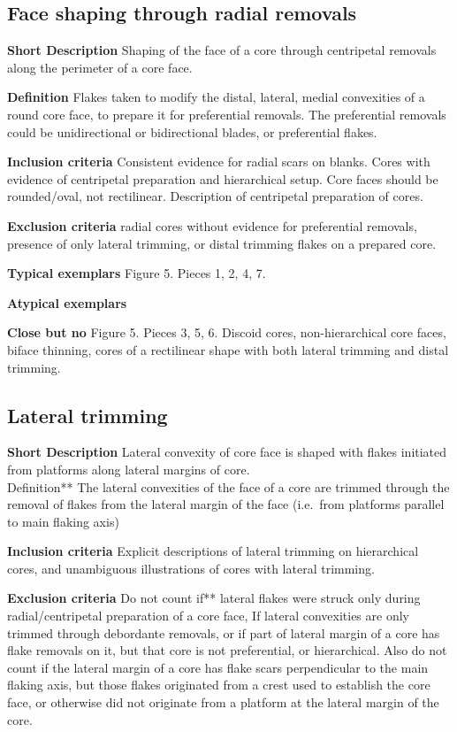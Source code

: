 \documentclass[
]{article}
\begin{document}
\hypertarget{face-shaping-through-radial-removals-1}{%
\subsection{Face shaping through radial
removals}\label{face-shaping-through-radial-removals-1}}

\textbf{Short Description} Shaping of the face of a core through
centripetal removals along the perimeter of a core face.

\textbf{Definition} Flakes taken to modify the distal, lateral, medial
convexities of a round core face, to prepare it for preferential
removals. The preferential removals could be unidirectional or
bidirectional blades, or preferential flakes.

\textbf{Inclusion criteria} Consistent evidence for radial scars on
blanks. Cores with evidence of centripetal preparation and hierarchical
setup. Core faces should be rounded/oval, not rectilinear. Description
of centripetal preparation of cores.

\textbf{Exclusion criteria} radial cores without evidence for
preferential removals, presence of only lateral trimming, or distal
trimming flakes on a prepared core.

\textbf{Typical exemplars} Figure 5. Pieces 1, 2, 4, 7.

\textbf{Atypical exemplars}

\textbf{Close but no} Figure 5. Pieces 3, 5, 6. Discoid cores,
non-hierarchical core faces, biface thinning, cores of a rectilinear
shape with both lateral trimming and distal trimming.

\hypertarget{lateral-trimming}{%
\subsection{Lateral trimming}\label{lateral-trimming}}

\textbf{Short Description} Lateral convexity of core face is shaped with
flakes initiated from platforms along lateral margins of core.\\
Definition** The lateral convexities of the face of a core are trimmed
through the removal of flakes from the lateral margin of the face
(i.e.~from platforms parallel to main flaking axis)

\textbf{Inclusion criteria} Explicit descriptions of lateral trimming on
hierarchical cores, and unambiguous illustrations of cores with lateral
trimming.

\textbf{Exclusion criteria} Do not count if** lateral flakes were struck
only during radial/centripetal preparation of a core face, If lateral
convexities are only trimmed through debordante removals, or if part of
lateral margin of a core has flake removals on it, but that core is not
preferential, or hierarchical. Also do not count if the lateral margin
of a core has flake scars perpendicular to the main flaking axis, but
those flakes originated from a crest used to establish the core face, or
otherwise did not originate from a platform at the lateral margin of the
core.
\end{document}

